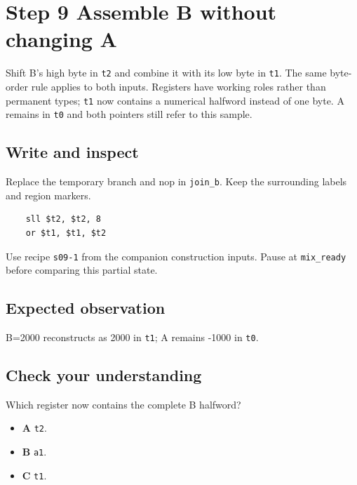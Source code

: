 \section{Step 9 Assemble B without changing A}\label{pcm-s09}

Shift B’s high byte in \texttt{t2} and combine it with its low byte in \texttt{t1}. The same byte-order rule applies to both inputs. Registers have working roles rather than permanent types; \texttt{t1} now contains a numerical halfword instead of one byte. A remains in \texttt{t0} and both pointers still refer to this sample.

\subsection{Write and inspect}
Replace the temporary branch and nop in \texttt{join\_b}. Keep the surrounding labels and region markers.

\begin{verbatim}
    sll $t2, $t2, 8
    or $t1, $t1, $t2
\end{verbatim}
Use recipe \texttt{s09-1} from the companion construction inputs. Pause at \texttt{mix\_ready} before comparing this partial state.

\subsection{Expected observation}
B=2000 reconstructs as 2000 in \texttt{t1}; A remains -1000 in \texttt{t0}.

\subsection{Check your understanding}
Which register now contains the complete B halfword?

\begin{itemize}
  \item \textbf{A} \texttt{t2}.
  \item \textbf{B} \texttt{a1}.
  \item \textbf{C} \texttt{t1}.
\end{itemize}
